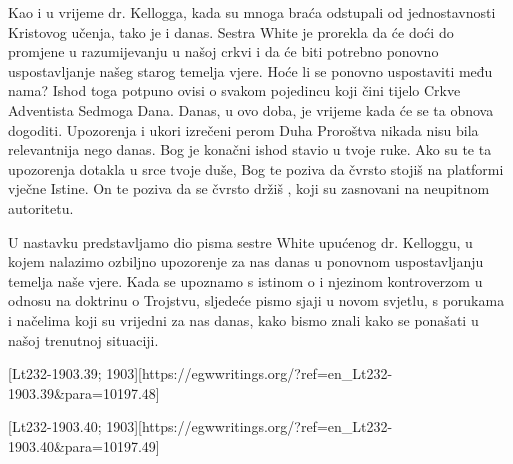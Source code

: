 Kao i u vrijeme dr. Kellogga, kada su mnoga braća odstupali od jednostavnosti Kristovog učenja, tako je i danas. Sestra White je prorekla da će doći do promjene u razumijevanju  u našoj crkvi i da će biti potrebno ponovno uspostavljanje našeg starog temelja vjere. Hoće li se  ponovno uspostaviti među nama? Ishod toga potpuno ovisi o svakom pojedincu koji čini tijelo Crkve Adventista Sedmoga Dana. Danas, u ovo doba, je vrijeme kada će se ta obnova dogoditi. Upozorenja i ukori izrečeni perom Duha Proroštva nikada nisu bila relevantnija nego danas. Bog je konačni ishod stavio u tvoje ruke. Ako su te ta upozorenja dotakla u srce tvoje duše, Bog te poziva da čvrsto stojiš na platformi vječne Istine. On te poziva da se čvrsto držiš , koji su zasnovani na neupitnom autoritetu.

U nastavku predstavljamo dio pisma sestre White upućenog dr. Kelloggu, u kojem nalazimo ozbiljno upozorenje za nas danas u ponovnom uspostavljanju temelja naše vjere. Kada se upoznamo s istinom o  i njezinom kontroverzom u odnosu na doktrinu o Trojstvu, sljedeće pismo sjaji u novom svjetlu, s porukama i načelima koji su vrijedni za nas danas, kako bismo znali kako se ponašati u našoj trenutnoj situaciji.


[Lt232-1903.39; 1903][https://egwwritings.org/?ref=en\_Lt232-1903.39&para=10197.48]

[Lt232-1903.40; 1903][https://egwwritings.org/?ref=en\_Lt232-1903.40&para=10197.49]

